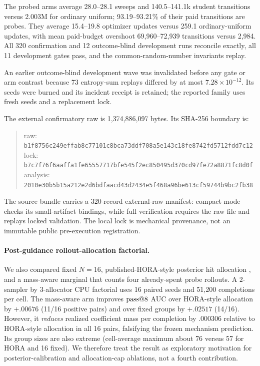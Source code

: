 The probed arms average 28.0--28.1 sweeps and 140.5--141.1k student
transitions versus 2.003M for ordinary uniform; 93.19--93.21\% of their paid
transitions are probes. They average 15.4--19.8 optimizer updates versus
259.1 ordinary-uniform updates, with mean paid-budget overshoot 69,960--72,939
transitions versus 2,984. All 320 confirmation and 12 outcome-blind
development runs reconcile exactly, all 11 development gates pass, and the
common-random-number invariants replay.

An earlier outcome-blind development wave was invalidated before any gate or
arm contrast because 73 entropy-sum replays differed by at most
$7.28\times10^{-12}$. Its seeds were burned and its incident receipt is
retained; the reported family uses fresh seeds and a replacement lock.

The external confirmatory raw is 1,374,886,097 bytes. Its SHA-256 boundary is:
\begin{quote}\scriptsize
raw: \texttt{b1f8756c249effab8c77101c8bca73ddf708a5e143c18fe8742fd5712fdd7c12}\\
lock: \texttt{b7c7f76f6aaffa1fe65557717bfe545f2ec850495d370cd97fe72a8871fc8d0f}\\
analysis: \texttt{2010e30b5b15a212e2d6bdfaacd43d2434e5f468a96be613cf59744b9bc2fb38}
\end{quote}
The source bundle carries a 320-record external-raw manifest: compact mode
checks its small-artifact bindings, while full verification requires the raw
file and replays locked validation. The local lock is mechanical provenance,
not an immutable public pre-execution registration.

\paragraph{Post-guidance rollout-allocation factorial.}
We also compared fixed $N=16$, published-HORA-style posterior hit allocation
\citep{hora}, and a mass-aware marginal that counts four already-spent probe
rollouts. A $2$-sampler by $3$-allocator CPU factorial uses 16 paired seeds and
51,200 completions per cell. The mass-aware arm improves $\text{pass@}8$ AUC over
HORA-style allocation by $+.00676$ (11/16 positive pairs) and over fixed groups
by $+.02517$ (14/16). However, it \emph{reduces} realized coefficient mass per
completion by $.000306$ relative to HORA-style allocation in all 16 pairs,
falsifying the frozen mechanism prediction. Its group sizes are also extreme
(cell-average maximum about 76 versus 57 for HORA and 16 fixed). We therefore
treat the result as exploratory motivation for posterior-calibration and
allocation-cap ablations, not a fourth contribution.

